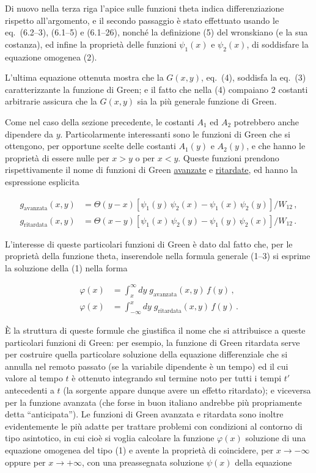 \documentclass[11pt, a4paper]{book}
\numberwithin{equation}{section}
\begin{document}
Di nuovo nella terza riga l'apice sulle funzioni theta indica differenziazione rispetto all'argomento, e il secondo passaggio è stato effettuato usando le eq.\ (6.2--3), (6.1--5) e (6.1--26), nonché la definizione (5) del wronskiano (e la sua costanza), ed infine la proprietà delle funzioni $\psi_1(x)$ e $\psi_2(x)$, di soddisfare la equazione omogenea (2).

L'ultima equazione ottenuta mostra che la $G(x,y)$, eq.\ (4), soddisfa la eq.\ (3) caratterizzante la funzione di Green; e il fatto che nella (4) compaiano 2 costanti arbitrarie assicura che la $G(x,y)$ sia la più generale funzione di Green.


Come nel caso della sezione precedente, le costanti $A_1$ ed $A_2$ potrebbero anche dipendere da $y$. Particolarmente interessanti sono le funzioni di Green che si ottengono, per opportune scelte delle costanti $A_1(y)$ e $A_2(y)$, e che hanno le proprietà di essere nulle per $x > y$ o per $x < y$. Queste funzioni prendono rispettivamente il nome di funzioni di Green \underline{avanzate} e \underline{ritardate}, ed hanno la espressione esplicita

\begin{align}
\tag{6a} g_{\text{avanzata}}(x,y) &= \Theta(y-x)\left[\psi_1(y)\,\psi_2(x) - \psi_1(x)\,\psi_2(y)\right]/W_{12}\,, \\
\tag{6b} g_{\text{ritardata}}(x,y) &= \Theta(x-y)\left[\psi_1(x)\,\psi_2(y) - \psi_1(y)\,\psi_2(x)\right]/W_{12}\,.
\end{align}

L'interesse di queste particolari funzioni di Green è dato dal fatto che, per le proprietà della funzione theta, inserendole nella formula generale (1--3) si esprime la soluzione della (1) nella forma

\begin{align}
\tag{7a} \varphi(x) &= \int_x^{\infty} dy\; g_{\text{avanzata}}(x,y)\,f(y)\,, \\
\tag{7b} \varphi(x) &= \int_{-\infty}^{x} dy\; g_{\text{ritardata}}(x,y)\,f(y)\,.
\end{align}

È la struttura di queste formule che giustifica il nome che si attribuisce a queste particolari funzioni di Green: per esempio, la funzione di Green ritardata serve per costruire quella particolare soluzione della equazione differenziale che si annulla nel remoto passato (se la variabile dipendente è un tempo) ed il cui valore al tempo $t$ è ottenuto integrando sul termine noto per tutti i tempi $t'$ antecedenti a $t$ (la sorgente appare dunque avere un effetto ritardato); e viceversa per la funzione avanzata (che forse in buon italiano andrebbe più propriamente detta ``anticipata''). Le funzioni di Green avanzata e ritardata sono inoltre evidentemente le più adatte per trattare problemi con condizioni al contorno di tipo asintotico, in cui cioè si voglia calcolare la funzione $\varphi(x)$ soluzione di una equazione omogenea del tipo (1) e avente la proprietà di coincidere, per $x \to -\infty$ oppure per $x \to +\infty$, con una preassegnata soluzione $\psi(x)$ della equazione
\end{document}
